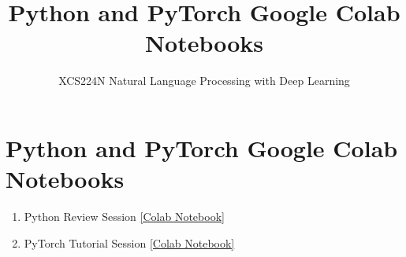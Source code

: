 \documentclass{article}
\title{Python and PyTorch Google Colab Notebooks}
\author{XCS224N Natural Language Processing with Deep Learning}
\date{}
\begin{document}
\maketitle

\section{Python and PyTorch Google Colab Notebooks}
\begin{enumerate}
    \item Python Review Session \href{https://colab.research.google.com/drive/1eO8eLGXxSo9fYMXw-dUEWPwkolIzDpxf?usp=sharing}{[Colab Notebook]}
    \item PyTorch Tutorial Session \href{https://colab.research.google.com/drive/1vRl0d1kyws6MHlG7Gttul3iuUbpGbuHS?usp=sharing}{[Colab Notebook]}
\end{enumerate}
\end{document}
